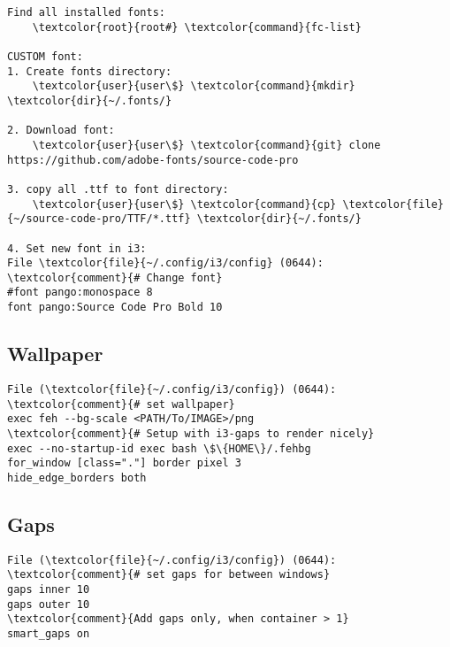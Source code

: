 \documentclass[10pt, a4paper, onecolumn, openany]{book}         %
\begin{document}
\begin{Verbatim}[commandchars=\\\{\}]
Find all installed fonts:
    \textcolor{root}{root#} \textcolor{command}{fc-list}

CUSTOM font:
1. Create fonts directory:
    \textcolor{user}{user\$} \textcolor{command}{mkdir} \textcolor{dir}{~/.fonts/}
 
2. Download font:
    \textcolor{user}{user\$} \textcolor{command}{git} clone https://github.com/adobe-fonts/source-code-pro
    
3. copy all .ttf to font directory:
    \textcolor{user}{user\$} \textcolor{command}{cp} \textcolor{file}{~/source-code-pro/TTF/*.ttf} \textcolor{dir}{~/.fonts/}

4. Set new font in i3:
File \textcolor{file}{~/.config/i3/config} (0644):
\textcolor{comment}{# Change font}
#font pango:monospace 8
font pango:Source Code Pro Bold 10
\end{Verbatim}


\subsection{Wallpaper}
\begin{Verbatim}[commandchars=\\\{\}]
File (\textcolor{file}{~/.config/i3/config}) (0644):
\textcolor{comment}{# set wallpaper}
exec feh --bg-scale <PATH/To/IMAGE>/png
\textcolor{comment}{# Setup with i3-gaps to render nicely}
exec --no-startup-id exec bash \$\{HOME\}/.fehbg
for_window [class="."] border pixel 3
hide_edge_borders both
\end{Verbatim}


\subsection{Gaps}
\begin{Verbatim}[commandchars=\\\{\}]
File (\textcolor{file}{~/.config/i3/config}) (0644):
\textcolor{comment}{# set gaps for between windows}
gaps inner 10
gaps outer 10
\textcolor{comment}{Add gaps only, when container > 1}
smart_gaps on
\end{Verbatim}
\end{document}
